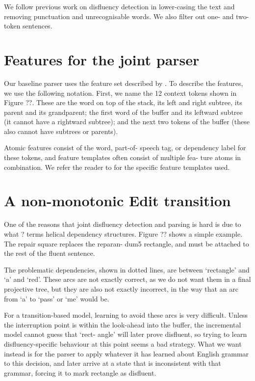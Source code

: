 \documentclass[11pt,letterpaper]{article}
\begin{document}
We follow previous work on disfluency detection in lower-casing the text and
removing punctuation and unrecognisable words. We also filter out one- and two-token
sentences.

\section{Features for the joint parser}

Our baseline parser uses the feature set described by \citet{zhang:11}.
To describe the features, we use the following notation. First, we name the
12 context tokens shown in Figure ??. These are the word on top of the stack, its
left and right subtree, its parent and its grandparent; the first word of the buffer
and its leftward subtree (it cannot have a rightward subtree); and the next two
tokens of the buffer (these also cannot have subtrees or parents).

Atomic features consist of the word, part-of- speech tag, or dependency label
for these tokens, and feature templates often consist of multiple fea- ture atoms
in combination. We refer the reader to \citet{zhang:11} for the specific feature
templates used.

\section{A non-monotonic Edit transition}

One of the reasons that joint disfluency detection and parsing is hard is due to
what ? terms helical dependency structures. Figure ?? shows a simple example.
The repair square replaces the reparan- dum5 rectangle, and must be attached to
the rest of the fluent sentence.

The problematic dependencies, shown in dotted lines, are between `rectangle'
and `a' and `red'. These arcs are not exactly correct, as we do not want them in
a final projective tree, but they are also not exactly incorrect, in the way that
an arc from `a' to `pass' or `me' would be.

For a transition-based model, learning to avoid these arcs is very difficult.
Unless the interruption point is within the look-ahead into the buffer, the
incremental model cannot guess that ‘rect- angle’ will later prove disfluent,
so trying to learn disfluency-specific behaviour at this point seems a bad strategy.
What we want instead is for the parser to apply whatever it has learned about English
grammar to this decision, and later arrive at a state that is inconsistent with
that grammar, forcing it to mark rectangle as disfluent.
\end{document}
